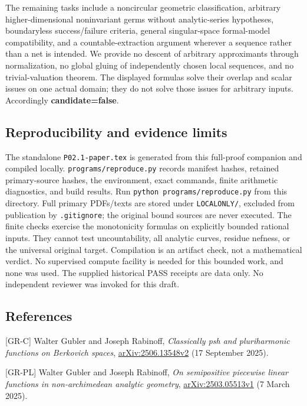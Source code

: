 \documentclass[
  11pt,
]{article}
\begin{document}
The remaining tasks include a noncircular geometric classification,
arbitrary higher-dimensional noninvariant germs without analytic-series
hypotheses, boundaryless success/failure criteria, general
singular-space formal-model compatibility, and a countable-extraction
argument wherever a sequence rather than a net is intended. We provide
no descent of arbitrary approximants through normalization, no global
gluing of independently chosen local sequences, and no trivial-valuation
theorem. The displayed formulas solve their overlap and scalar issues on
one actual domain; they do not solve those issues for arbitrary inputs.
Accordingly \textbf{candidate=false}.

\subsection{Reproducibility and evidence
limits}\label{reproducibility-and-evidence-limits}

The standalone \texttt{P02.1-paper.tex} is generated from this
full-proof companion and compiled locally.
\texttt{programs/reproduce.py} records manifest hashes, retained
primary-source hashes, the environment, exact commands, finite
arithmetic diagnostics, and build results. Run
\texttt{python\ programs/reproduce.py} from this directory. Full primary
PDFs/texts are stored under \texttt{LOCALONLY/}, excluded from
publication by \texttt{.gitignore}; the original bound sources are never
executed. The finite checks exercise the monotonicity formulas on
explicitly bounded rational inputs. They cannot test uncountability, all
analytic curves, residue nefness, or the universal original target.
Compilation is an artifact check, not a mathematical verdict. No
supervised compute facility is needed for this bounded work, and none
was used. The supplied historical PASS receipts are data only. No
independent reviewer was invoked for this draft.

\subsection{References}\label{references}

{[}GR-C{]} Walter Gubler and Joseph Rabinoff, \emph{Classically psh and
pluriharmonic functions on Berkovich spaces},
\href{https://arxiv.org/abs/2506.13548v2}{arXiv:2506.13548v2} (17
September 2025).

{[}GR-PL{]} Walter Gubler and Joseph Rabinoff, \emph{On semipositive
piecewise linear functions in non-archimedean analytic geometry},
\href{https://arxiv.org/abs/2503.05513v1}{arXiv:2503.05513v1} (7 March
2025).
\end{document}
